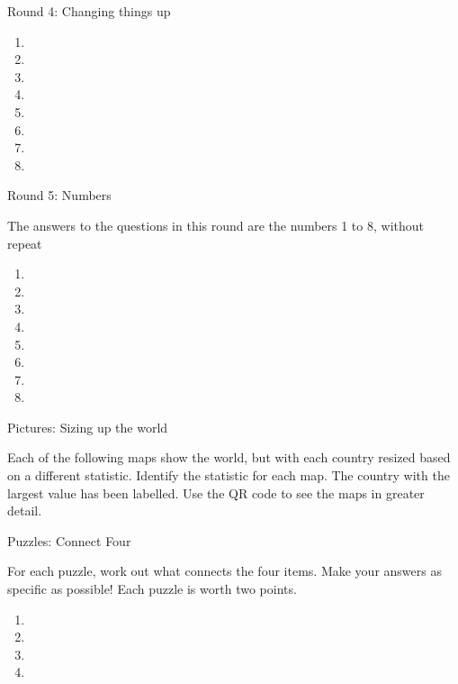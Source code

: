 \newpage
\begin{center}
\Huge
Round 4: Changing things up
\end{center}
\large
\Huge
\begin{enumerate}
\item
\item
\item
\item
\item
\item
\item
\item
\end{enumerate}

\newpage
\begin{center}
\Huge
Round 5: Numbers
\end{center}
\large
The answers to the questions in this round are the numbers 1 to 8, without repeat

\Huge
\begin{enumerate}
\item
\item
\item
\item
\item
\item
\item
\item
\end{enumerate}

\newpage
\begin{center}
\Huge
Pictures: Sizing up the world
\end{center}
\large
Each of the following maps show the world, but with each country resized based on a different statistic. Identify the statistic for each map. The country with the largest value has been labelled. Use the QR code to see the maps in greater detail.


\newpage
\begin{center}
\Huge
Puzzles: Connect Four
\end{center}
\large
For each puzzle, work out what connects the four items. Make your answers as specific as possible! Each puzzle is worth two points.

\large
\begin{enumerate}
\item 
\item 
\item 
\item 
\end{enumerate}

